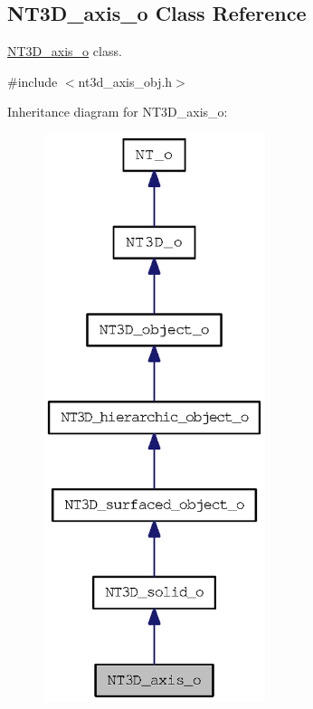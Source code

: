 \subsection{NT3D\_\-axis\_\-o Class Reference}
\label{class_n_t3_d__axis__o}


\hyperlink{class_n_t3_d__axis__o}{NT3D\_\-axis\_\-o} class.  




{\ttfamily \#include $<$nt3d\_\-axis\_\-obj.h$>$}



Inheritance diagram for NT3D\_\-axis\_\-o:
\nopagebreak
\begin{figure}[H]
\begin{center}
\leavevmode
\includegraphics[width=184pt]{class_n_t3_d__axis__o__inherit__graph}
\end{center}
\end{figure}


